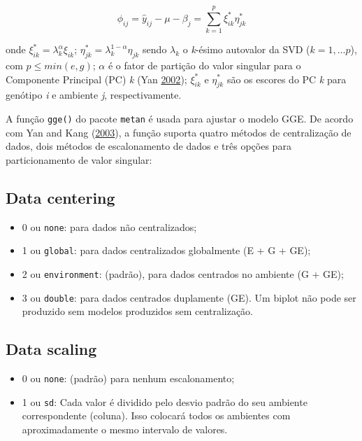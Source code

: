 \documentclass[
]{book}
\providecommand{\tightlist}{%
  \setlength{\itemsep}{0pt}\setlength{\parskip}{0pt}}
\numberwithin{equation}{section}
\begin{document}
\[
{\phi_{ij} =  \hat y_{ij}} - \mu - \beta_j  = \sum\limits_{k = 1}^p \xi_{ik}^*\eta_{jk}^*
\]

onde \(\xi_{ik}^* = \lambda_k^ \alpha \xi_{ik}\); \(\eta_{jk}^* = \lambda_k^{1-\alpha}\eta_{jk}\) sendo \(\lambda_k\) o \emph{k}-ésimo autovalor da SVD (\(k = 1, ... p\)), com \(p \le min (e, g)\); \(\alpha\) é o fator de partição do valor singular para o Componente Principal (PC) \emph{k} (Yan \protect\hyperlink{ref-Yan2002b}{2002}); \(\xi_{ik}^*\) e \(\eta_{jk}^*\) são os escores do PC \emph{k} para genótipo \emph{i} e ambiente \emph{j}, respectivamente.

A função \texttt{gge()} do pacote \texttt{metan} é usada para ajustar o modelo GGE. De acordo com Yan and Kang (\protect\hyperlink{ref-Yan2003}{2003}), a função suporta quatro métodos de centralização de dados, dois métodos de escalonamento de dados e três opções para particionamento de valor singular:

\hypertarget{data-centering}{%
\subsection{Data centering}\label{data-centering}}

\begin{itemize}
\tightlist
\item
  0 ou \texttt{none}: para dados não centralizados;
\item
  1 ou \texttt{global}: para dados centralizados globalmente (E + G + GE);
\item
  2 ou \texttt{environment}: (padrão), para dados centrados no ambiente (G + GE);
\item
  3 ou \texttt{double}: para dados centrados duplamente (GE). Um biplot não pode ser produzido sem modelos produzidos sem centralização.
\end{itemize}

\hypertarget{data-scaling}{%
\subsection{Data scaling}\label{data-scaling}}

\begin{itemize}
\tightlist
\item
  0 ou \texttt{none}: (padrão) para nenhum escalonamento;
\item
  1 ou \texttt{sd}: Cada valor é dividido pelo desvio padrão do seu ambiente correspondente (coluna). Isso colocará todos os ambientes com aproximadamente o mesmo intervalo de valores.
\end{itemize}
\end{document}
